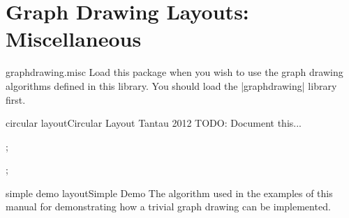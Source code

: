 %
%
%

\section{Graph Drawing Layouts: Miscellaneous}
\label{section-last-graphdrawing-library-in-manual}


\begin{tikzlibrary}{graphdrawing.misc}
  Load this package when you wish to use the graph drawing algorithms
  defined in this library. You should load the |graphdrawing| library first.
\end{tikzlibrary}


\begin{gdalgorithm}{circular layout}{Circular Layout Tantau 2012}
  TODO: Document this...

\begin{codeexample}[]
\tikz[>=spaced stealth']
  ;    
\end{codeexample}

\begin{codeexample}[]
\tikz[>=spaced stealth']
  ; 
\end{codeexample}
\end{gdalgorithm}

\begin{gdalgorithm}{simple demo layout}{Simple Demo}
  The algorithm used in the examples of this manual for demonstrating
  how a trivial graph drawing can be implemented.
\end{gdalgorithm}




